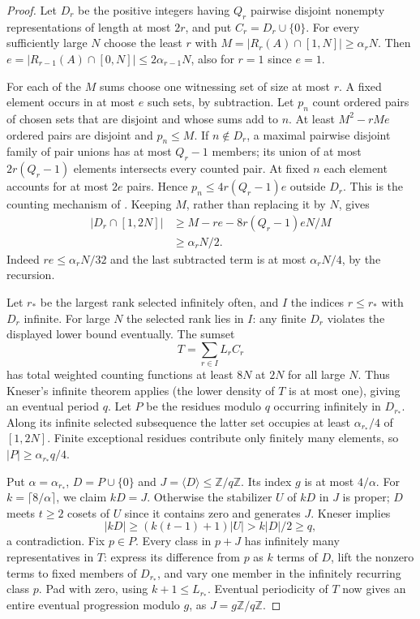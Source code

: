 \documentclass[11pt]{article}
\theoremstyle{remark}\newtheorem{remark}[theorem]{Remark}
\newcommand{\Z}{\mathbb Z}
\begin{document}
\begin{proof}
Let $D_r$ be the positive integers having $Q_r$ pairwise disjoint nonempty representations of length at most $2r$, and put $C_r=D_r\cup\{0\}$. For every sufficiently large $N$ choose the least $r$ with $M=|R_r(A)\cap[1,N]|\ge\alpha_rN$. Then $e=|R_{r-1}(A)\cap[0,N]|\le2\alpha_{r-1}N$, also for $r=1$ since $e=1$.

For each of the $M$ sums choose one witnessing set of size at most $r$. A fixed element occurs in at most $e$ such sets, by subtraction. Let $p_n$ count ordered pairs of chosen sets that are disjoint and whose sums add to $n$. At least $M^2-rMe$ ordered pairs are disjoint and $p_n\le M$. If $n\notin D_r$, a maximal pairwise disjoint family of pair unions has at most $Q_r-1$ members; its union of at most $2r(Q_r-1)$ elements intersects every counted pair. At fixed $n$ each element accounts for at most $2e$ pairs. Hence $p_n\le4r(Q_r-1)e$ outside $D_r$. This is the counting mechanism of \cite[Lemma 3]{CYZ}. Keeping $M$, rather than replacing it by $N$, gives
\begin{align*}
 |D_r\cap[1,2N]|&\ge M-re-8r(Q_r-1)eN/M\\
 &\ge\alpha_r N/2.
\end{align*}
Indeed $re\le\alpha_r N/32$ and the last subtracted term is at most $\alpha_r N/4$, by the recursion.

Let $r_*$ be the largest rank selected infinitely often, and $I$ the indices $r\le r_*$ with $D_r$ infinite. For large $N$ the selected rank lies in $I$: any finite $D_r$ violates the displayed lower bound eventually. The sumset
\[T=\sum_{r\in I}L_r C_r\]
has total weighted counting functions at least $8N$ at $2N$ for all large $N$. Thus Kneser's infinite theorem applies (the lower density of $T$ is at most one), giving an eventual period $q$. Let $P$ be the residues modulo $q$ occurring infinitely in $D_{r_*}$. Along its infinite selected subsequence the latter set occupies at least $\alpha_{r_*}/4$ of $[1,2N]$. Finite exceptional residues contribute only finitely many elements, so $|P|\ge\alpha_{r_*}q/4$.

Put $\alpha=\alpha_{r_*}$, $D=P\cup\{0\}$ and $J=\langle D\rangle\le\Z/q\Z$. Its index $g$ is at most $4/\alpha$. For $k=\lceil8/\alpha\rceil$, we claim $kD=J$. Otherwise the stabilizer $U$ of $kD$ in $J$ is proper; $D$ meets $t\ge2$ cosets of $U$ since it contains zero and generates $J$. Kneser implies
\[|kD|\ge(k(t-1)+1)|U|>k|D|/2\ge q,\]
a contradiction. Fix $p\in P$. Every class in $p+J$ has infinitely many representatives in $T$: express its difference from $p$ as $k$ terms of $D$, lift the nonzero terms to fixed members of $D_{r_*}$, and vary one member in the infinitely recurring class $p$. Pad with zero, using $k+1\le L_{r_*}$. Eventual periodicity of $T$ now gives an entire eventual progression modulo $g$, as $J=g\Z/q\Z$.


\end{proof}
\end{document}
